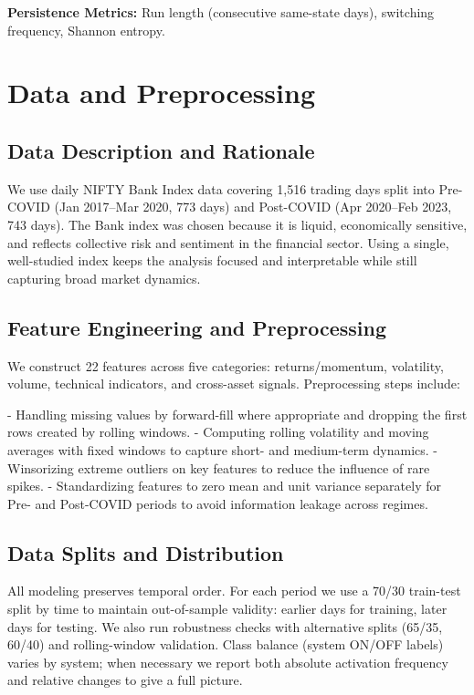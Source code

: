 \documentclass[conference]{IEEEtran}
\begin{document}
\textbf{Persistence Metrics:} Run length (consecutive same-state days), switching frequency, Shannon entropy.

\section{Data and Preprocessing}

\subsection{Data Description and Rationale}

We use daily NIFTY Bank Index data covering 1,516 trading days split into Pre-COVID (Jan 2017--Mar 2020, 773 days) and Post-COVID (Apr 2020--Feb 2023, 743 days). The Bank index was chosen because it is liquid, economically sensitive, and reflects collective risk and sentiment in the financial sector. Using a single, well-studied index keeps the analysis focused and interpretable while still capturing broad market dynamics.

\subsection{Feature Engineering and Preprocessing}
We construct 22 features across five categories: returns/momentum, volatility, volume, technical indicators, and cross-asset signals. Preprocessing steps include:

- Handling missing values by forward-fill where appropriate and dropping the first rows created by rolling windows.
- Computing rolling volatility and moving averages with fixed windows to capture short- and medium-term dynamics.
- Winsorizing extreme outliers on key features to reduce the influence of rare spikes.
- Standardizing features to zero mean and unit variance separately for Pre- and Post-COVID periods to avoid information leakage across regimes.

\subsection{Data Splits and Distribution}
All modeling preserves temporal order. For each period we use a 70/30 train-test split by time to maintain out-of-sample validity: earlier days for training, later days for testing. We also run robustness checks with alternative splits (65/35, 60/40) and rolling-window validation. Class balance (system ON/OFF labels) varies by system; when necessary we report both absolute activation frequency and relative changes to give a full picture.
\end{document}
